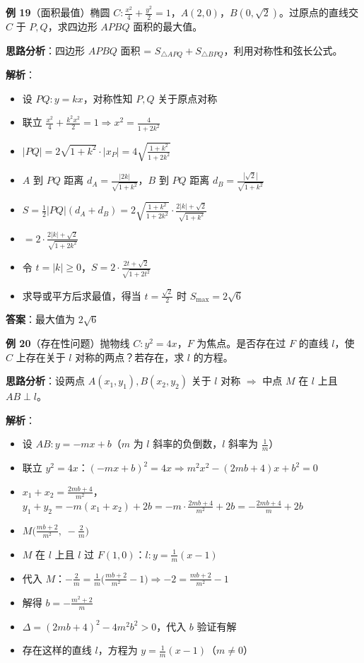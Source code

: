 \textbf{例 19}（面积最值）椭圆 $C:\frac{x^2}{4}+\frac{y^2}{2}=1$，$A(2,0)$，$B(0,\sqrt{2})$。过原点的直线交 $C$ 于 $P,Q$，求四边形 $APBQ$ 面积的最大值。

\textbf{思路分析}：四边形 $APBQ$ 面积 = $S_{\triangle APQ}+S_{\triangle BPQ}$，利用对称性和弦长公式。

\textbf{解析}：
\begin{itemize}
  \item 设 $PQ:y=kx$，对称性知 $P,Q$ 关于原点对称
  \item 联立 $\frac{x^2}{4}+\frac{k^2x^2}{2}=1 \Rightarrow x^2=\frac{4}{1+2k^2}$
  \item $|PQ|=2\sqrt{1+k^2}\cdot|x_P| = 4\sqrt{\frac{1+k^2}{1+2k^2}}$
  \item $A$ 到 $PQ$ 距离 $d_A=\frac{|2k|}{\sqrt{1+k^2}}$，$B$ 到 $PQ$ 距离 $d_B=\frac{|\sqrt{2}|}{\sqrt{1+k^2}}$
  \item $S=\frac12|PQ|(d_A+d_B)=2\sqrt{\frac{1+k^2}{1+2k^2}}\cdot\frac{2|k|+\sqrt{2}}{\sqrt{1+k^2}}$
  \item $=2\cdot\frac{2|k|+\sqrt{2}}{\sqrt{1+2k^2}}$
  \item 令 $t=|k|\ge0$，$S=2\cdot\frac{2t+\sqrt{2}}{\sqrt{1+2t^2}}$
  \item 求导或平方后求最值，得当 $t=\frac{\sqrt{2}}{2}$ 时 $S_{\max}=2\sqrt{6}$
\end{itemize}

\textbf{答案}：最大值为 $2\sqrt{6}$

\textbf{例 20}（存在性问题）抛物线 $C:y^2=4x$，$F$ 为焦点。是否存在过 $F$ 的直线 $l$，使 $C$ 上存在关于 $l$ 对称的两点？若存在，求 $l$ 的方程。

\textbf{思路分析}：设两点 $A(x_1,y_1),B(x_2,y_2)$ 关于 $l$ 对称 $\Rightarrow$ 中点 $M$ 在 $l$ 上且 $AB\perp l$。

\textbf{解析}：
\begin{itemize}
  \item 设 $AB:y=-mx+b$（$m$ 为 $l$ 斜率的负倒数，$l$ 斜率为 $\frac1m$）
  \item 联立 $y^2=4x$：$(-mx+b)^2=4x \Rightarrow m^2x^2-(2mb+4)x+b^2=0$
  \item $x_1+x_2=\frac{2mb+4}{m^2}$，$y_1+y_2=-m(x_1+x_2)+2b = -m\cdot\frac{2mb+4}{m^2}+2b = -\frac{2mb+4}{m}+2b$
  \item $M\big(\frac{mb+2}{m^2},\;-\frac{2}{m}\big)$
  \item $M$ 在 $l$ 上且 $l$ 过 $F(1,0)$：$l:y=\frac1m(x-1)$
  \item 代入 $M$：$-\frac2m = \frac1m\big(\frac{mb+2}{m^2}-1\big) \Rightarrow -2 = \frac{mb+2}{m^2}-1$
  \item 解得 $b = -\frac{m^2+2}{m}$
  \item $\Delta = (2mb+4)^2-4m^2b^2 > 0$，代入 $b$ 验证有解
  \item 存在这样的直线 $l$，方程为 $y=\frac1m(x-1)$（$m\neq0$）
\end{itemize}

